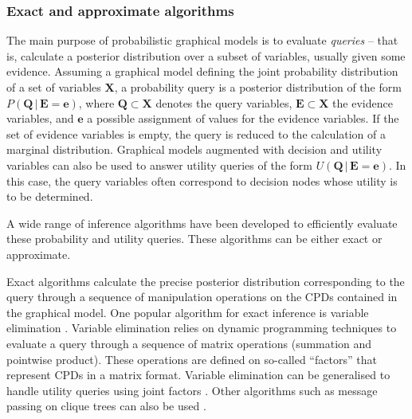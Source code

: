\subsubsection*{Exact and approximate algorithms}
The main purpose of probabilistic graphical models is to evaluate \textit{queries} -- that is, calculate a posterior distribution over a subset of variables, usually given some evidence. Assuming a graphical model defining the joint probability distribution of a set of variables $\mathbf{X}$, a probability query is a posterior distribution of the form $P(\mathbf{Q}  \, | \,  \mathbf{E}\!=\!\mathbf{e})$, where $\mathbf{Q} \subset \mathbf{X}$ denotes the query variables, $\mathbf{E} \subset \mathbf{X}$ the evidence variables, and $\mathbf{e}$ a possible assignment of values for the evidence variables.  If the set of evidence variables is empty, the query is reduced to the calculation of a marginal distribution.  Graphical models augmented with decision and utility variables can also be used to answer utility queries of the form $U(\mathbf{Q}   \, | \,  \mathbf{E}\!=\!\mathbf{e})$.  In this case, the query variables often correspond to decision nodes whose utility is to be determined.

A wide range of inference algorithms have been developed to efficiently evaluate these probability and utility queries. These algorithms can be either exact or approximate.  

Exact algorithms
 calculate the precise posterior distribution corresponding to the query through a sequence of manipulation operations on the CPDs contained in the graphical model.  One popular algorithm for exact inference is variable elimination \citep{ZhangP96}.  Variable elimination relies on dynamic programming techniques to evaluate a query through a sequence of matrix operations (summation and pointwise product). These operations are defined on so-called ``factors'' that represent CPDs in a matrix format. Variable elimination can be generalised to handle utility queries using joint factors \citep{Koller+Friedman:09}.   Other algorithms such as message passing on clique trees can also be used \citep{jensen1990}. 


